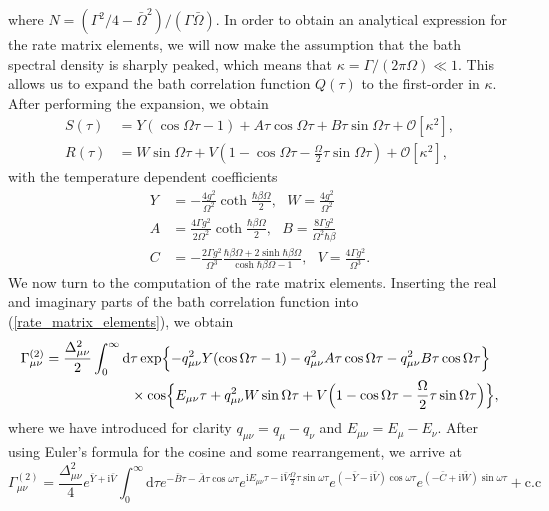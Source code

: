 %
where $N=(\Gamma^2/4-\bar{\Omega}^2)/(\Gamma\bar{\Omega})$. In order to obtain an analytical
expression for the rate matrix elements, we will now make the assumption that the bath 
spectral density is sharply peaked, which means that $\kappa=\Gamma/(2\pi\Omega)\ll1$.
This allows us to expand the bath correlation function $Q(\tau)$ to the first-order in $\kappa$.
After performing the expansion, we obtain
%
\begin{align}
    S(\tau) &= Y(\cos \Omega \tau - 1)+A \tau \cos \Omega \tau +B \tau \sin \Omega \tau
    + \mathcal{O}\left[\kappa^2\right], \\
    R(\tau) &= W\sin\Omega\tau+V(1-\cos\Omega\tau-\frac{\Omega}{2}\tau\sin\Omega\tau)
    + \mathcal{O}\left[\kappa^2\right],
\end{align}
%
with the temperature dependent coefficients
%
\begin{align}
    Y &= -\frac{4g^2}{\Omega^2}\coth\frac{\hbar\beta\Omega}{2}, \ \ \ W = \frac{4g^2}{\Omega^2} \\
    A &= \frac{4\Gamma g^2}{2\Omega^2}\coth\frac{\hbar\beta\Omega}{2}, \ \ \ B = \frac{8\Gamma g^2}{\Omega^2\hbar\beta} \\
    C &= -\frac{2\Gamma g^2}{\Omega^3}\frac{\hbar\beta\Omega +2\sinh\hbar\beta\Omega}{\cosh\hbar\beta\Omega-1}, \ \ \ V = \frac{4\Gamma g^2}{\Omega^3}.
\end{align}
%
We now turn to the computation of the rate matrix elements.
Inserting the real and imaginary parts of the bath correlation function into (\ref{rate_matrix_elements}),
we obtain
%
\begin{equation}
\begin{split}
    \Gamma_{\mu\nu}^{(2)} = \frac{\Delta_{\mu\nu}^2}{2} \int_{0}^{\infty} \text{d} & \tau 
    \exp \Bigl\{-q_{\mu\nu}^2 Y(\cos\Omega\tau-1) -q_{\mu\nu}^2 A\tau\cos\Omega\tau
    - q_{\mu\nu}^2 B\tau\cos\Omega\tau \Bigr\} \\
    & \times \cos \Bigl\{ E_{\mu\nu} \tau + q_{\mu\nu}^2 W\sin\Omega\tau + 
    V \Bigl( 1-\cos\Omega\tau -\frac{\Omega}{2}\tau \sin\Omega\tau \Bigr) \Bigr\},
\end{split}
\end{equation}
%
where we have introduced for clarity $q_{\mu\nu}=q_\mu - q_\nu$ and $E_{\mu\nu}=E_\mu - E_\nu$.
After using Euler's formula for the cosine and some rearrangement, we arrive at
%
\begin{equation}
    \Gamma_{\mu\nu}^{(2)} = \frac{\Delta_{\mu\nu}^2}{4} e^{ \bar{Y} + \text{i} \bar{V}} \int_{0}^{\infty} \text{d}\tau
    e^{- \bar{B} \tau -\bar{A} \tau \cos\omega\tau}
    e^{\text{i}E_{\mu\nu}\tau-\text{i}\bar{V} \frac{\Omega}{2} \tau\sin\omega\tau}
    e^{(-\bar{Y}-\text{i}\bar{V})\cos\omega\tau}
    e^{(-\bar{C}+\text{i}\bar{W})\sin\omega\tau} + \text{c.c}
\end{equation}
